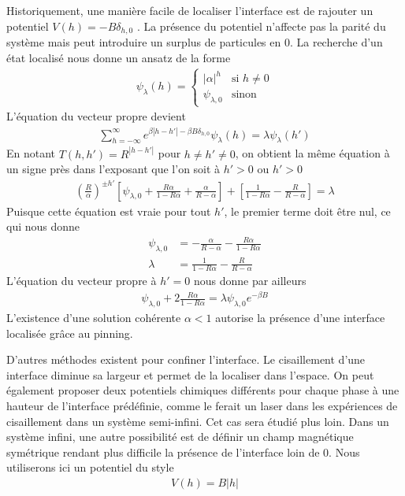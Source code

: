 Historiquement, une manière facile de localiser l'interface est de rajouter un potentiel $V(h) = -B \delta_{h,0}$ \cite{chui_pinning_1999}. La présence du potentiel n'affecte pas la parité du système mais peut introduire un surplus de particules en $0$. La recherche d'un état localisé nous donne un ansatz de la forme 
\begin{align}
	\psi_\lambda(h) = \begin{cases} |\alpha|^h & \text{si } h \neq 0 \\ \psi_{\lambda,0} & \text{sinon} \end{cases} 
\end{align}
L'équation du vecteur propre devient
\begin{align}
	\sum_{h=-\infty}^\infty e^{\beta |h-h'|- \beta B \delta_{h,0}} \psi_\lambda(h) = \lambda \psi_\lambda(h')
\end{align}
En notant $T(h,h') = R^{|h-h'|}$ pour $h \neq h' \neq 0$,  on obtient la même équation à un signe près dans l'exposant que l'on soit à $h'>0$ ou $h'>0$
\begin{align}
	\left( \frac{R}{\alpha} \right)^{\pm h'} \left[ \psi_{\lambda,0} + \frac{R \alpha}{1 - R \alpha} + \frac{\alpha}{R - \alpha} \right] + \left[ \frac{1}{1-R \alpha} - \frac{R}{R-\alpha} \right] = \lambda
\end{align}
Puisque cette équation est vraie pour tout $h'$, le premier terme doit être nul, ce qui nous donne
\begin{align}
	\psi_{\lambda,0} &= - \frac{\alpha}{R-\alpha}-\frac{R \alpha}{1-R \alpha} \\
	\lambda &= \frac{1}{1-R \alpha} - \frac{R}{R-\alpha}
\end{align}
L'équation du vecteur propre à $h'=0$ nous donne par ailleurs 
\begin{align}
	\psi_{\lambda,0} + 2 \frac{R \alpha}{1-R \alpha} = \lambda \psi_{\lambda,0} e^{-\beta B}
\end{align}
L'existence d'une solution cohérente $\alpha < 1$ autorise la présence d'une interface localisée grâce au pinning.

D'autres méthodes existent pour confiner l'interface. Le cisaillement d'une interface diminue sa largeur et permet de la localiser dans l'espace. On peut également proposer deux potentiels chimiques différents pour chaque phase à une hauteur de l'interface prédéfinie, comme le ferait un laser dans les expériences de cisaillement\cite{delville} dans un système semi-infini. Cet cas sera étudié plus loin. Dans un système infini, une autre possibilité est de définir un champ magnétique symétrique rendant plus difficile la présence de l'interface loin de $0$. Nous utiliserons ici un potentiel du style
\begin{align}
		  V(h) = B |h|
\end{align}


